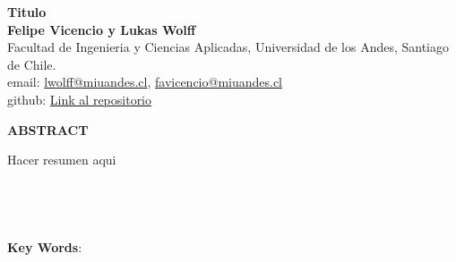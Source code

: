 \documentclass[12pt]{article} %
\begin{document}
\begin{titlepage}%
\newcommand{\HRule}{\rule{\linewidth}{0.5mm}} 
\center 
\begin{center}
  \textbf{\LARGE Titulo} \\[0.5cm]
  \textbf{Felipe Vicencio y Lukas Wolff} \\
  Facultad de Ingenieria y Ciencias Aplicadas, Universidad de los Andes, Santiago de Chile.\\
  email: \href{mailto:lwolff@miuandes.cl}{lwolff@miuandes.cl}, \href{mailto:favicencio@miuandes.cl}{favicencio@miuandes.cl}
  \\
  github: \href{https://github.com/LukasWolff2002/TAREA_3_AUTITOS}{Link al repositorio}
\end{center}

\vspace{1cm}

\begin{center}
  \textbf{\large ABSTRACT}    
\end{center}

\begin{justify}
  Hacer resumen aqui
  \\ \\ \\ \\ \\
  \textbf{Key Words}: 
\end{justify}


\vspace{1cm}

\end{titlepage}



\setcounter{page}{1}


\end{document}
